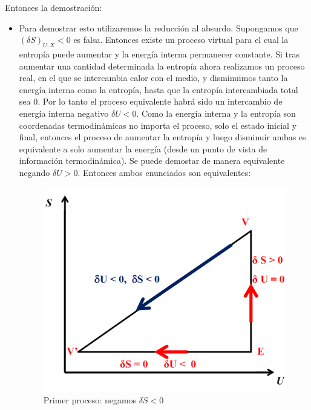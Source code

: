 \documentclass[12pt,a4paper]{article}
\begin{document}
Entonces la demostración:

\begin{itemize}
\item Para demostrar esto utilizaremos la reducción al absurdo. Supongamos que $(\delta S)_{U,X} < 0$ es falsa. Entonces existe un proceso virtual para el cual la entropía puede aumentar y la energía interna permanecer constante. Si tras aumentar una cantidad determinada la entropía ahora realizamos un proceso real, en el que se intercambia calor con el medio, y disminuimos tanto la energía interna como la entropía, hasta que la entropía intercambiada total sea 0. Por lo tanto el proceso equivalente habrá sido un intercambio de energía interna negativo $\delta U < 0$. Como la energía interna y la entropía son coordenadas termodinámicas no importa el proceso, solo el estado inicial y final, entonces el proceso de aumentar la entropía y luego disminuír ambas es equivalente a solo aumentar la energía (desde un punto de vista de información termodinámica). Se puede demostar de manera equivalente negando $\delta U > 0$. Entonces ambos enunciados son equivalentes:

\begin{figure}[h!] \centering 
\includegraphics[scale=0.5]{demostracion-1.png}
\caption{Primer proceso: negamos $\delta S<0$}
\end{figure}


\end{itemize}
\end{document}
